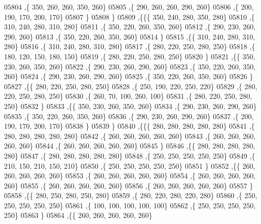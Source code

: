 \begin{DoxyCode}
05804     ,\{   350,   260,   260,   350,   260\}
05805     ,\{   290,   260,   260,   290,   260\}
05806     ,\{   200,   190,   170,   200,   170\}
05807     \}
05808    \}
05809   ,\{\{\{   350,   240,   280,   350,   280\}
05810     ,\{   310,   240,   280,   310,   280\}
05811     ,\{   350,   220,   260,   350,   260\}
05812     ,\{   290,   230,   260,   290,   260\}
05813     ,\{   350,   220,   260,   350,   260\}
05814     \}
05815    ,\{\{   310,   240,   280,   310,   280\}
05816     ,\{   310,   240,   280,   310,   280\}
05817     ,\{   280,   220,   250,   280,   250\}
05818     ,\{   180,   120,   150,   180,   150\}
05819     ,\{   280,   220,   250,   280,   250\}
05820     \}
05821    ,\{\{   350,   230,   260,   350,   260\}
05822     ,\{   290,   230,   260,   290,   260\}
05823     ,\{   350,   220,   260,   350,   260\}
05824     ,\{   290,   230,   260,   290,   260\}
05825     ,\{   350,   220,   260,   350,   260\}
05826     \}
05827    ,\{\{   280,   220,   250,   280,   250\}
05828     ,\{   250,   190,   220,   250,   220\}
05829     ,\{   280,   220,   250,   280,   250\}
05830     ,\{   260,    70,   100,   260,   100\}
05831     ,\{   280,   220,   250,   280,   250\}
05832     \}
05833    ,\{\{   350,   230,   260,   350,   260\}
05834     ,\{   290,   230,   260,   290,   260\}
05835     ,\{   350,   220,   260,   350,   260\}
05836     ,\{   290,   230,   260,   290,   260\}
05837     ,\{   200,   190,   170,   200,   170\}
05838     \}
05839    \}
05840   ,\{\{\{   280,   280,   280,   280,   280\}
05841     ,\{   280,   280,   280,   280,   280\}
05842     ,\{   260,   260,   260,   260,   260\}
05843     ,\{   260,   260,   260,   260,   260\}
05844     ,\{   260,   260,   260,   260,   260\}
05845     \}
05846    ,\{\{   280,   280,   280,   280,   280\}
05847     ,\{   280,   280,   280,   280,   280\}
05848     ,\{   250,   250,   250,   250,   250\}
05849     ,\{   210,   150,   210,   150,   210\}
05850     ,\{   250,   250,   250,   250,   250\}
05851     \}
05852    ,\{\{   260,   260,   260,   260,   260\}
05853     ,\{   260,   260,   260,   260,   260\}
05854     ,\{   260,   260,   260,   260,   260\}
05855     ,\{   260,   260,   260,   260,   260\}
05856     ,\{   260,   260,   260,   260,   260\}
05857     \}
05858    ,\{\{   280,   250,   280,   250,   280\}
05859     ,\{   280,   220,   280,   220,   280\}
05860     ,\{   250,   250,   250,   250,   250\}
05861     ,\{   100,   100,   100,   100,   100\}
05862     ,\{   250,   250,   250,   250,   250\}
05863     \}
05864    ,\{\{   260,   260,   260,   260,   260\}

\end{DoxyCode}
